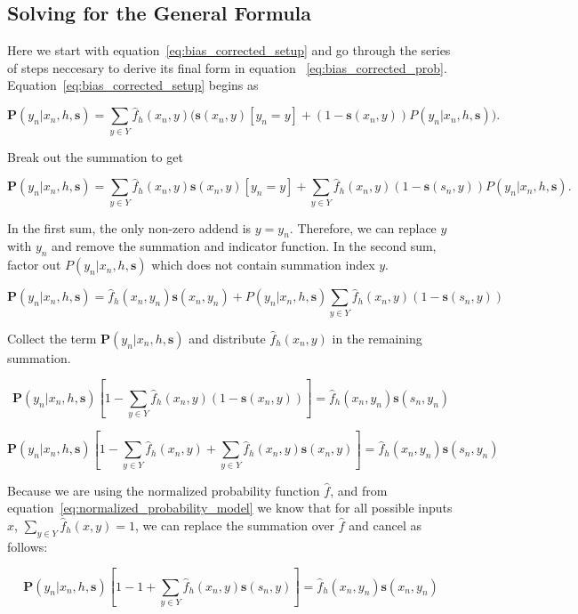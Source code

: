 \documentclass[twoside]{article}
\begin{document}
\begin{appendices}

\section{Solving for the General Formula}
\label{appendix:solving}

Here we start with equation~\eqref{eq:bias_corrected_setup} and go through the series of steps neccesary to derive its final form in equation ~\eqref{eq:bias_corrected_prob}. Equation~\eqref{eq:bias_corrected_setup} begins as

\[\mathbf{P}(y_n|x_n,h,\mathbf{s})=\sum_{y \in Y}\hat{f}_h(x_n,y)\big(\mathbf{s}(x_n,y)\left [y_n = y\right ] + (1-\mathbf{s}(x_n,y))P(y_n|x_n,h,\mathbf{s})\big).\]

Break out the summation to get

\[\mathbf{P}(y_n|x_n,h,\mathbf{s})=\sum_{y \in Y}\hat{f}_h(x_n,y)\mathbf{s}(x_n,y)\left [y_n = y\right ] +\sum_{y \in Y}\hat{f}_h(x_n,y)(1-\mathbf{s}(s_n,y))P(y_n|x_n,h,\mathbf{s}).\]

In the first sum, the only non-zero addend is \(y = y_n\). Therefore, we can replace \(y\) with \(y_n\) and remove the summation and indicator function. In the second sum, factor out \(P(y_n|x_n,h,\mathbf{s})\) which does not contain summation index \(y\).

\[\mathbf{P}(y_n|x_n,h,\mathbf{s})=\hat{f}_h(x_n,y_n)\mathbf{s}(x_n,y_n) +P(y_n|x_n,h,\mathbf{s})\sum_{y \in Y}\hat{f}_h(x_n,y)(1-\mathbf{s}(s_n,y))\]

Collect the term \(\mathbf{P}(y_n|x_n,h,\mathbf{s})\) and distribute \(\hat{f}_h(x_n,y)\) in the remaining summation.

\[\mathbf{P}(y_n|x_n,h,\mathbf{s})\left [ 1 - \sum_{y \in Y}\hat{f}_h(x_n,y)(1-\mathbf{s}(x_n,y)) \right ]=\hat{f}_h(x_n,y_n)\mathbf{s}(s_n,y_n) \]

\[\mathbf{P}(y_n|x_n,h,\mathbf{s})\left [ 1 - \sum_{y \in Y}\hat{f}_h(x_n,y)+\sum_{y \in Y}\hat{f}_h(x_n,y)\mathbf{s}(x_n,y) \right ]=\hat{f}_h(x_n,y_n)\mathbf{s}(s_n,y_n) \]

Because we are using the normalized probability function \(\hat{f}\), and from equation~\eqref{eq:normalized_probability_model} we know that for all possible inputs \(x\), \(\sum_{y \in Y} \hat{f}_h(x, y) = 1\), we can replace the summation over \(\hat{f}\) and cancel as follows:

\[\mathbf{P}(y_n|x_n,h,\mathbf{s})\left [ 1 - 1+\sum_{y \in Y}\hat{f}_h(x_n,y)\mathbf{s}(s_n,y) \right ]=\hat{f}_h(x_n,y_n)\mathbf{s}(x_n,y_n) \]


\end{appendices}
\end{document}
